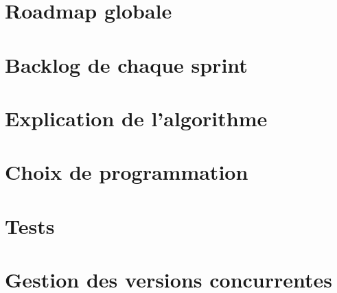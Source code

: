 \documentclass{tstextbook}
\begin{document}
\chapter{Roadmap globale}


\chapter{Backlog de chaque sprint}


\chapter{Explication de l'algorithme}


\chapter{Choix de programmation}


\chapter{Tests}


\chapter{Gestion des versions concurrentes}
\end{document}
